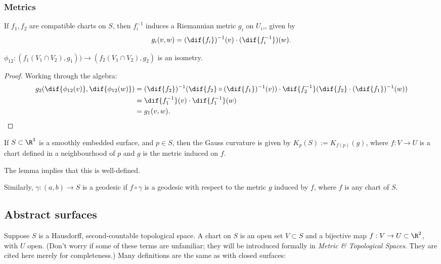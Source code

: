 \subsubsection*{Metrics} %
\label{ssub:metrics}

If $f_1,f_2$ are compatible charts on $S$, then $f_i^{-1}$ induces a Riemannian metric $g_i$ on $U_i$,, given by
\begin{equation*}
	g_i(\vv,\ww) = (\dif{f_i})^{-1}(\vv) \cdot (\dif{f_i^{-1}})(\ww).
\end{equation*}

\begin{lemma}
	$\phi_{12}:(f_1(V_1 \cap V_2), g_1)) \to (f_2(V_1 \cap V_2), g_2)$ is an isometry.
\end{lemma}

\begin{proof}
	Working through the algebra:
	\begin{align*}
		g_2(\dif{\phi_{12}(\vv)}, \dif{\phi_{12}(\ww)})
		&= (\dif{f_2})^{-1} (\dif{f_2} \circ (\dif{f_1})^{-1} (\vv)) \cdot \dif{f_2^{-1}}(\dif{f_2} \cdot (\dif{f_1})^{-1}(\ww)) \\
		&= \dif{f_1^{-1}}(\vv) \cdot \dif{f_1^{-1}}(\ww) \\
		&= g_1(\vv,\ww). \qedhere
	\end{align*}
\end{proof}

If $S\subset \R^3$ is a smoothly embedded surface, and $p\in S$, then the Gauss curvature is given by $K_p(S) := K_{f(p)}(g)$, where $f:V\to U$ is a chart defined in a neighbourhood of $p$ and $g$ is the metric induced on $f$.

The lemma implies that this is well-defined.

Similarly, $\gamma:(a,b) \to S$ is a geodesic if $f\circ \gamma$ is a geodesic with respect to the metric $g$ induced by $f$, where $f$ is any chart of $S$.



\subsection{Abstract surfaces} %
\label{sub:abstract_surfaces}

Suppose $S$ is a Hausdorff, second-countable topological space. A chart on $S$ is an open set $V\subset S$ and a bijective map $f:V\to U \subset \R^2$, with $U$ open. (Don't worry if some of these terms are unfamiliar; they will be introduced formally in \emph{Metric \& Topological Spaces}. They are cited here merely for completeness.) Many definitions are the same as with closed surfaces:

